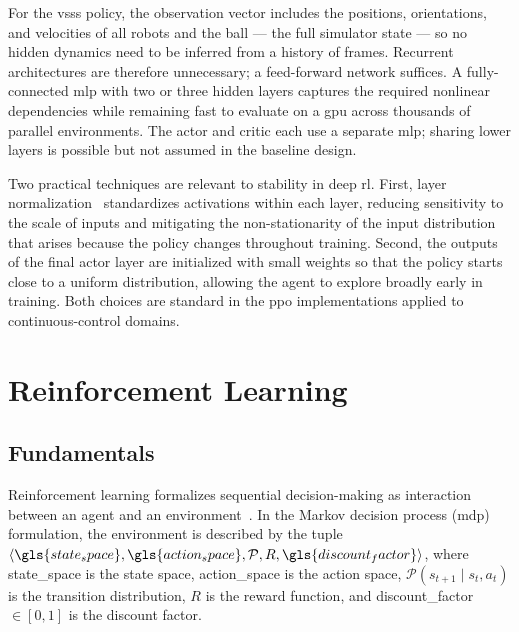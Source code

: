 For the \gls{vsss} policy, the observation vector includes the positions,
orientations, and velocities of all robots and the ball — the full simulator
state — so no hidden dynamics need to be inferred from a history of frames.
Recurrent architectures are therefore unnecessary; a feed-forward network
suffices.  A fully-connected
\gls{mlp} with two or three hidden layers captures the required nonlinear
dependencies while remaining fast to evaluate on a \gls{gpu} across thousands
of parallel environments.  The actor and critic each use a separate
\gls{mlp}; sharing lower layers is possible but not assumed in the baseline
design.

Two practical techniques are relevant to stability in deep \gls{rl}.  First,
layer normalization~\cite{goodfellow2016deep} standardizes activations within
each layer, reducing sensitivity to the scale of inputs and mitigating the
non-stationarity of the input distribution that arises because the policy
changes throughout training.  Second, the outputs of the final actor layer
are initialized with small weights so that the policy starts close to a
uniform distribution, allowing the agent to explore broadly early in
training.  Both choices are standard in the \gls{ppo} implementations applied
to continuous-control domains.

\section{Reinforcement Learning}
\label{sec:rl}

\subsection{Fundamentals}

Reinforcement learning formalizes sequential decision-making as interaction
between an agent and an environment~\cite{sutton2018reinforcement}.  In the
Markov decision process (\gls{mdp}) formulation, the environment is described
by the tuple $\langle \gls{state_space}, \gls{action_space}, \mathcal{P}, R, \gls{discount_factor}
\rangle$, where \gls{state_space} is the state space, \gls{action_space} is the action
space, $\mathcal{P}(s_{t+1} \mid s_t, a_t)$ is the transition distribution,
$R$ is the reward function, and \gls{discount_factor} $\in [0,1]$ is the discount factor.

